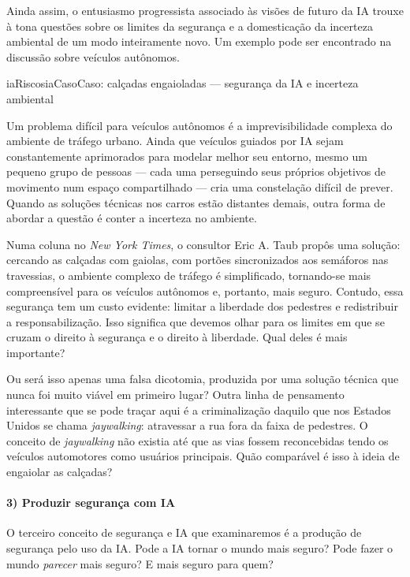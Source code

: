 \documentclass[
  11pt,
]{article}
\newenvironment{definicao}[1][Definicao]{\begin{iabox}{iaRiscos}{iaCaso}{#1}}{\end{iabox}}
\begin{document}
Ainda assim, o entusiasmo progressista associado às visões de futuro da
IA trouxe à tona questões sobre os limites da segurança e a domesticação
da incerteza ambiental de um modo inteiramente novo. Um exemplo pode ser
encontrado na discussão sobre veículos autônomos.

\begin{definicao}[Caso: calçadas engaioladas — segurança da IA e incerteza ambiental]

Um problema difícil para veículos autônomos é a imprevisibilidade
complexa do ambiente de tráfego urbano. Ainda que veículos guiados por
IA sejam constantemente aprimorados para modelar melhor seu entorno,
mesmo um pequeno grupo de pessoas --- cada uma perseguindo seus próprios
objetivos de movimento num espaço compartilhado --- cria uma constelação
difícil de prever. Quando as soluções técnicas nos carros estão
distantes demais, outra forma de abordar a questão é conter a incerteza
no ambiente.

Numa coluna no \emph{New York Times}, o consultor Eric A. Taub propôs
uma solução: cercando as calçadas com gaiolas, com portões sincronizados
aos semáforos nas travessias, o ambiente complexo de tráfego é
simplificado, tornando-se mais compreensível para os veículos autônomos
e, portanto, mais seguro. Contudo, essa segurança tem um custo evidente:
limitar a liberdade dos pedestres e redistribuir a responsabilização.
Isso significa que devemos olhar para os limites em que se cruzam o
direito à segurança e o direito à liberdade. Qual deles é mais
importante?

Ou será isso apenas uma falsa dicotomia, produzida por uma solução
técnica que nunca foi muito viável em primeiro lugar? Outra linha de
pensamento interessante que se pode traçar aqui é a criminalização
daquilo que nos Estados Unidos se chama \emph{jaywalking}: atravessar a
rua fora da faixa de pedestres. O conceito de \emph{jaywalking} não
existia até que as vias fossem reconcebidas tendo os veículos
automotores como usuários principais. Quão comparável é isso à ideia de
engaiolar as calçadas?

\end{definicao}

\paragraph{3) Produzir segurança com
IA}\label{produzir-seguranuxe7a-com-ia}

O terceiro conceito de segurança e IA que examinaremos é a produção de
segurança pelo uso da IA. Pode a IA tornar o mundo mais seguro? Pode
fazer o mundo \emph{parecer} mais seguro? E mais seguro para quem?
\end{document}

